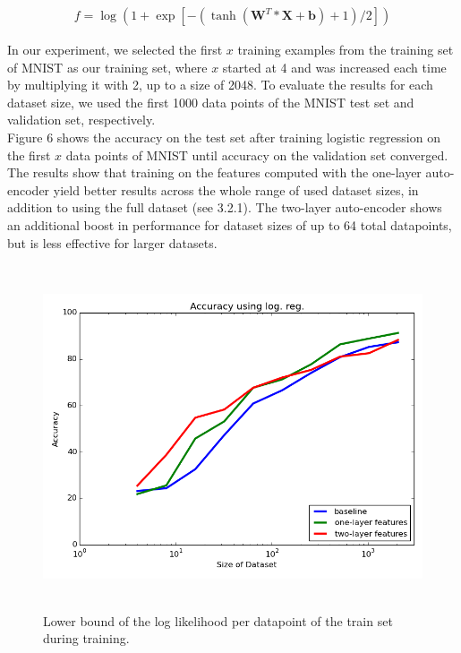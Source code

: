 \documentclass{article}
\begin{document}
\begin{align}
    f = \log(1 + \exp[-(\tanh(\textbf{W}^T*\textbf{X} + \textbf{b}) + 1)/2])
\end{align}

In our experiment, we selected the first $x$ training examples from the training set of MNIST as our training set, where $x$ started at 4 and was increased each time by multiplying it with 2, up to a size of 2048. To evaluate the results for each dataset size, we used the first 1000 data points of the MNIST test set and validation set, respectively.\\
Figure 6 shows the accuracy on the test set after training logistic regression on the first $x$ data points of MNIST until accuracy on the validation set converged. The results show that training on the features computed with the one-layer auto-encoder yield better results across the whole range of used dataset sizes, in addition to using the full dataset (see 3.2.1). The two-layer auto-encoder shows an additional boost in performance for dataset sizes of up to 64 total datapoints, but is less effective for larger datasets. \\

\begin{figure}[htb]
\begin{center}
\includegraphics[height=4in,width=5in]{logreg_smallsets_report.png}
\caption{Lower bound of the log likelihood per datapoint of the train set during training.}
\end{center}
\end{figure}
\end{document}
